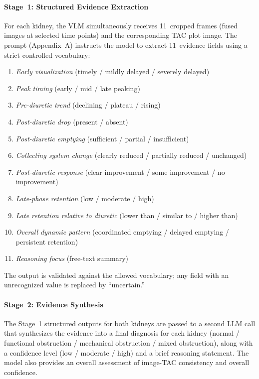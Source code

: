 \documentclass[sn-basic]{sn-jnl}
\begin{document}
\paragraph{Stage~1: Structured Evidence Extraction}
For each kidney, the VLM simultaneously receives 11~cropped
frames (fused images at selected time points) and the
corresponding TAC plot image.  The prompt (Appendix~A)
instructs the model to extract 11~evidence fields using a
strict controlled vocabulary:
\begin{enumerate}
  \item \textit{Early visualization} (timely / mildly delayed / severely delayed)
  \item \textit{Peak timing} (early / mid / late peaking)
  \item \textit{Pre-diuretic trend} (declining / plateau / rising)
  \item \textit{Post-diuretic drop} (present / absent)
  \item \textit{Post-diuretic emptying} (sufficient / partial / insufficient)
  \item \textit{Collecting system change} (clearly reduced / partially reduced / unchanged)
  \item \textit{Post-diuretic response} (clear improvement / some improvement / no improvement)
  \item \textit{Late-phase retention} (low / moderate / high)
  \item \textit{Late retention relative to diuretic} (lower than / similar to / higher than)
  \item \textit{Overall dynamic pattern} (coordinated emptying / delayed emptying / persistent retention)
  \item \textit{Reasoning focus} (free-text summary)
\end{enumerate}
The output is validated against the allowed vocabulary; any
field with an unrecognized value is replaced by
``uncertain.''

\paragraph{Stage~2: Evidence Synthesis}
The Stage~1 structured outputs for both kidneys are passed to
a second LLM call that synthesizes the evidence into a final
diagnosis for each kidney (normal / functional obstruction /
mechanical obstruction / mixed obstruction), along with a
confidence level (low / moderate / high) and a brief
reasoning statement.  The model also provides an overall
assessment of image-TAC consistency and overall confidence.
\end{document}
